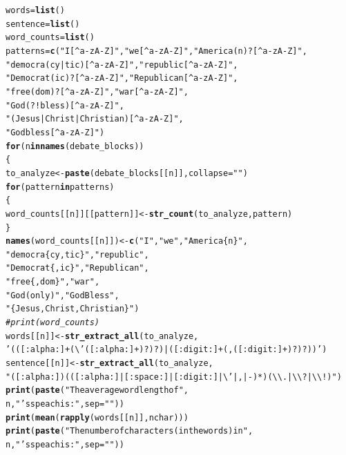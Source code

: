 \documentclass{article}\usepackage[]{graphicx}\usepackage[]{color}
\makeatletter
\newcommand{\hlstr}[1]{\textcolor[rgb]{0.192,0.494,0.8}{#1}}%
\newcommand{\hlcom}[1]{\textcolor[rgb]{0.678,0.584,0.686}{\textit{#1}}}%
\newcommand{\hlstd}[1]{\textcolor[rgb]{0.345,0.345,0.345}{#1}}%
\newcommand{\hlkwa}[1]{\textcolor[rgb]{0.161,0.373,0.58}{\textbf{#1}}}%
\newcommand{\hlkwb}[1]{\textcolor[rgb]{0.69,0.353,0.396}{#1}}%
\newcommand{\hlkwc}[1]{\textcolor[rgb]{0.333,0.667,0.333}{#1}}%
\newcommand{\hlkwd}[1]{\textcolor[rgb]{0.737,0.353,0.396}{\textbf{#1}}}%
\newenvironment{kframe}{%
 \def\at@end@of@kframe{}%
 \ifinner\ifhmode%
  \def\at@end@of@kframe{\end{minipage}}%
  \begin{minipage}{\columnwidth}%
 \fi\fi%
 \def\FrameCommand##1{\hskip\@totalleftmargin \hskip-\fboxsep
 \colorbox{shadecolor}{##1}\hskip-\fboxsep
     \hskip-\linewidth \hskip-\@totalleftmargin \hskip\columnwidth}%
 \MakeFramed {\advance\hsize-\width
   \@totalleftmargin\z@ \linewidth\hsize
   \@setminipage}}%
 {\par\unskip\endMakeFramed%
 \at@end@of@kframe}
\newenvironment{knitrout}{}{} %
\makeatother
\begin{document}
\begin{knitrout}
\begin{kframe}
\begin{alltt}
\hlstd{words} \hlkwb{=} \hlkwd{list}\hlstd{()}
\hlstd{sentence} \hlkwb{=} \hlkwd{list}\hlstd{()}
\hlstd{word_counts} \hlkwb{=} \hlkwd{list}\hlstd{()}
\hlstd{patterns} \hlkwb{=} \hlkwd{c}\hlstd{(}\hlstr{"I[^a-zA-Z]"}\hlstd{,} \hlstr{"we[^a-zA-Z]"}\hlstd{,} \hlstr{"America(n)?[^a-zA-Z]"}\hlstd{,}
             \hlstr{"democra(cy|tic)[^a-zA-Z]"}\hlstd{,} \hlstr{"republic[^a-zA-Z]"}\hlstd{,}
             \hlstr{"Democrat(ic)?[^a-zA-Z]"}\hlstd{,}\hlstr{"Republican[^a-zA-Z]"}\hlstd{,}
             \hlstr{"free(dom)?[^a-zA-Z]"}\hlstd{,} \hlstr{"war[^a-zA-Z]"}\hlstd{,}
             \hlstr{"God(?! bless)[^a-zA-Z]"}\hlstd{,}
             \hlstr{"(Jesus|Christ|Christian)[^a-zA-Z]"}\hlstd{,}
             \hlstr{"God bless[^a-zA-Z]"}\hlstd{)}
\hlkwa{for} \hlstd{(n} \hlkwa{in} \hlkwd{names}\hlstd{(debate_blocks))}
\hlstd{\{}
  \hlstd{to_analyze} \hlkwb{<-} \hlkwd{paste}\hlstd{(debate_blocks[[n]],}\hlkwc{collapse}\hlstd{=}\hlstr{" "}\hlstd{)}
  \hlkwa{for} \hlstd{(pattern} \hlkwa{in} \hlstd{patterns)}
  \hlstd{\{}
    \hlstd{word_counts[[n]][[pattern]]} \hlkwb{<-} \hlkwd{str_count}\hlstd{(to_analyze,pattern)}
  \hlstd{\}}
  \hlkwd{names}\hlstd{(word_counts[[n]])} \hlkwb{<-} \hlkwd{c}\hlstd{(}\hlstr{"I"}\hlstd{,}\hlstr{"we"}\hlstd{,}\hlstr{"America\{n\}"}\hlstd{,}
                               \hlstr{"democra\{cy,tic\}"}\hlstd{,}\hlstr{"republic"}\hlstd{,}
                               \hlstr{"Democrat\{,ic\}"}\hlstd{,}\hlstr{"Republican"}\hlstd{,}
                               \hlstr{"free\{,dom\}"}\hlstd{,}\hlstr{"war"}\hlstd{,}
                               \hlstr{"God (only)"}\hlstd{,}\hlstr{"God Bless"}\hlstd{,}
                               \hlstr{"\{Jesus, Christ, Christian\}"}\hlstd{)}
  \hlcom{# print(word_counts)}
  \hlstd{words[[n]]} \hlkwb{<-} \hlkwd{str_extract_all}\hlstd{(to_analyze,}
\hlstr{'(([:alpha:]+(\textbackslash{}'([:alpha:]+)?)?)|([:digit:]+(,([:digit:]+)?)?))'}\hlstd{)}
  \hlstd{sentence[[n]]} \hlkwb{<-} \hlkwd{str_extract_all}\hlstd{(to_analyze,}
\hlstr{"([:alpha:])(([:alpha:]|[:space:]|[:digit:]|\textbackslash{}'|,|-)*)(\textbackslash{}\textbackslash{}.|\textbackslash{}\textbackslash{}?|\textbackslash{}\textbackslash{}!)"}\hlstd{)}
  \hlkwd{print}\hlstd{(}\hlkwd{paste}\hlstd{(}\hlstr{"The average word length of "}\hlstd{,}
              \hlstd{n,}\hlstr{"'s speach is:"}\hlstd{,}\hlkwc{sep} \hlstd{=} \hlstr{""}\hlstd{))}
  \hlkwd{print}\hlstd{(}\hlkwd{mean}\hlstd{(}\hlkwd{rapply}\hlstd{(words[[n]],nchar)))}
  \hlkwd{print}\hlstd{(}\hlkwd{paste}\hlstd{(}\hlstr{"The number of characters (in the words) in "}\hlstd{,}
              \hlstd{n,}\hlstr{"'s speach is:"}\hlstd{,}\hlkwc{sep} \hlstd{=} \hlstr{""}\hlstd{))}

\end{alltt}
\end{kframe}
\end{knitrout}
\end{document}
